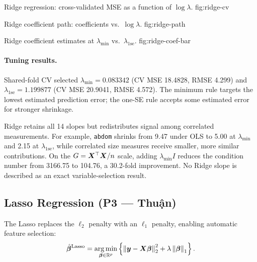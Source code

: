%
    {Ridge regression: cross-validated MSE as a function of $\log\lambda$.}%
    {fig:ridge-cv}

%
    {Ridge coefficient path: coefficients vs.\ $\log\lambda$.}%
    {fig:ridge-path}

%
    {Ridge coefficient estimates at $\lambda_{\min}$ vs.\ $\lambda_{1\mathrm{se}}$.}%
    {fig:ridge-coef-bar}

\paragraph{Tuning results.}
Shared-fold CV selected $\lambda_{\min}=0.083342$ (CV MSE 18.4828, RMSE
4.299) and $\lambda_{1\mathrm{se}}=1.199877$ (CV MSE 20.9041, RMSE 4.572).
The minimum rule targets the lowest estimated prediction error; the one-SE rule
accepts some estimated error for stronger shrinkage.





Ridge retains all 14 slopes but redistributes signal among correlated
measurements.  For example, \texttt{abdom} shrinks from 9.47 under OLS to 5.00
at $\lambda_{\min}$ and 2.15 at $\lambda_{1\mathrm{se}}$, while correlated
size measures receive smaller, more similar contributions.  On the
$G=\bm{X}^\top\bm{X}/n$ scale, adding $\lambda_{\min}I$ reduces the condition number
from 3166.75 to 104.76, a 30.2-fold improvement.  No Ridge slope is described
as an exact variable-selection result.

\subsection{Lasso Regression (P3 — Thuận)}
\label{sec:lasso}

The Lasso replaces the $\ell_2$ penalty with an $\ell_1$ penalty, enabling
automatic feature selection:
\[
    \hat{\bm{\beta}}^{\mathrm{Lasso}}
    = \operatorname*{arg\,min}_{\bm{\beta} \in \mathbb{R}^p}
      \left\{
          \left\lVert \bm{y} - \bm{X} \bm{\beta} \right\rVert_2^2
          + \lambda \left\lVert \bm{\beta} \right\rVert_1
      \right\}.
\]

